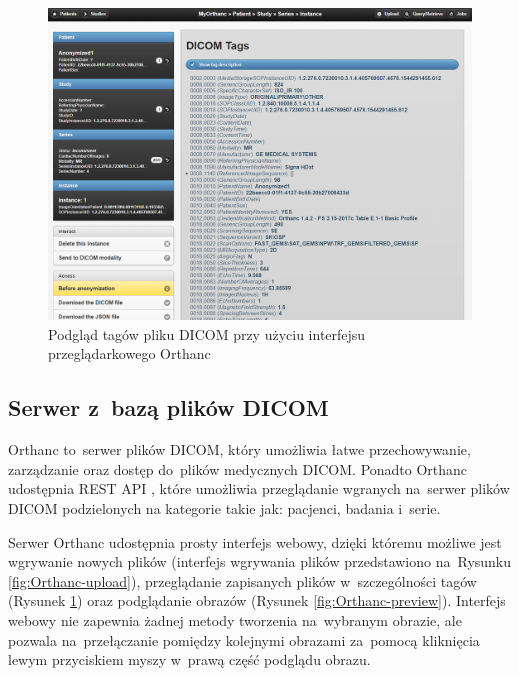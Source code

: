 \documentclass[a4paper,11pt,twoside,openright]{report}
\theoremstyle{definition}
\begin{document}
\begin{figure}[tbh!]
	\center
	\includegraphics[width=1\textwidth]{Orthanc-tags}
	\caption{Podgląd tagów pliku DICOM przy użyciu interfejsu przeglądarkowego Orthanc}
    	\label{fig:Orthanc-tags}
\end{figure}

\subsection {Serwer z~bazą plików DICOM}

Orthanc \cite{Orthanc} to~serwer plików DICOM, który umożliwia łatwe przechowywanie,
zarządzanie oraz dostęp do~plików medycznych DICOM. Ponadto Orthanc udostępnia
REST API \cite{Orthanc API}, które umożliwia przeglądanie wgranych na~serwer plików DICOM podzielonych
na kategorie takie jak: pacjenci, badania i~serie.

Serwer Orthanc udostępnia prosty interfejs webowy, dzięki któremu możliwe jest
wgrywanie nowych plików (interfejs wgrywania plików przedstawiono na~Rysunku
\ref{fig:Orthanc-upload}), przeglądanie zapisanych plików w~szczególności
tagów (Rysunek \ref{fig:Orthanc-tags}) oraz podglądanie obrazów (Rysunek \ref{fig:Orthanc-preview}).
Interfejs webowy nie zapewnia żadnej metody tworzenia na~wybranym obrazie, ale
pozwala na~przełączanie pomiędzy kolejnymi obrazami za~pomocą kliknięcia lewym
przyciskiem myszy w~prawą część podglądu obrazu.
\end{document}
